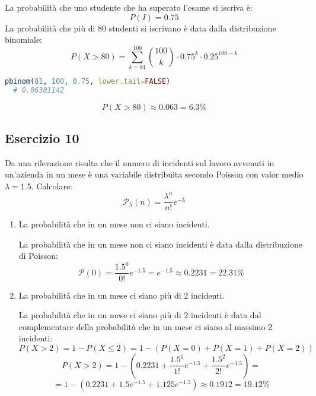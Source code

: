 \documentclass[a4paper]{article}
\theoremstyle{break}
\theoremstyle{break}
\theoremstyle{break}
\theoremstyle{break}
\begin{document}
\vspace{1em}
\noindent La probabilità che uno studente che ha superato l'esame si iscriva è:
\[
	P(I) = 0.75
\]
La probabilità che più di 80 studenti si iscrivano è data dalla distribuzione binomiale:
\[
\]
\[
	P(X > 80) = \sum_{k=81}^{100} \binom{100}{k} \cdot 0.75^k \cdot 0.25^{100-k}
\]
\begin{lstlisting}[language=R]
  pbinom(81, 100, 0.75, lower.tail=FALSE)
  # 0.06301142
\end{lstlisting}
\[
	P(X > 80) \approx 0.063 = 6.3\%
\]

\subsection{Esercizio 10}
Da una rilevazione risulta che il numero di incidenti sul lavoro avvenuti in un'azienda
in un mese è una variabile distribuita secondo Poisson con valor medio \( \lambda = 1.5 \).
Calcolare:
\[
	\mathcal{P}_{\lambda}(n) = \frac{\lambda^n}{n!}e^{-\lambda}
\]
\begin{enumerate}
	\item La probabilità che in un mese non ci siano incidenti.

	      \vspace{1em}
	      La probabilità che in un mese non ci siano incidenti è data dalla distribuzione
	      di Poisson:
	      \[
		      \mathcal{P}(0) = \frac{1.5^0}{0!}e^{-1.5} = e^{-1.5} \approx 0.2231 = 22.31\%
	      \]
	\item La probabilità che in un mese ci siano più di 2 incidenti.

	      \vspace{1em}
	      La probabilità che in un mese ci siano più di 2 incidenti è data dal complementare
	      della probabilità che in un mese ci siano al massimo 2 incidenti:
	      \[
		      P(X > 2) = 1 - P(X \le 2) = 1 - \left( P(X = 0) + P(X = 1) + P(X = 2) \right)
	      \]
	      \[
		      P(X > 2) = 1 - \left( 0.2231 + \frac{1.5^1}{1!}e^{-1.5} +
		      \frac{1.5^2}{2!}e^{-1.5} \right) =
	      \]
	      \[
		      = 1 - \left( 0.2231 + 1.5e^{-1.5} + 1.125e^{-1.5} \right) \approx 0.1912 = 19.12\%
	      \]
\end{enumerate}
\end{document}

